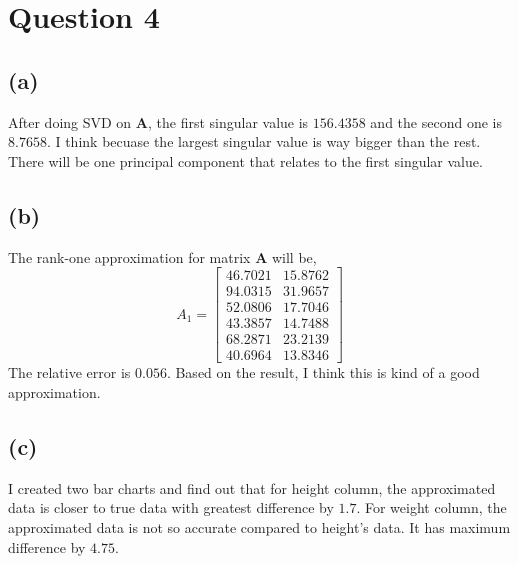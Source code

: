 \documentclass{article}
\newcommand{\bmat}[1]{\begin{bmatrix} #1 \end{bmatrix}}
\newcommand{\mat}[1]{\mathbf{#1}}
\begin{document}
\section*{Question 4}
\subsection*{(a)}
After doing SVD on $\mat{A}$, the first singular value is $156.4358$ and the second one is $8.7658$. I think 
becuase the largest singular value is way bigger than the rest. There will be
one principal component that relates to the first singular value.
\subsection*{(b)}

The rank-one approximation for matrix $\mat{A}$ will be, 
$$A_1 = \bmat{ 46.7021 &  15.8762\\
94.0315 &  31.9657 \\
52.0806  & 17.7046\\
43.3857  & 14.7488\\
68.2871  & 23.2139\\
40.6964  & 13.8346}$$
The relative error is $0.056$. Based on the result, I think this is kind of a good
approximation.

\subsection*{(c)}
I created two bar charts and find out that for height column, the approximated 
data is closer to true data with greatest difference by $1.7$. For weight column,
the approximated data is not so accurate compared to height's data. It has maximum difference 
by $4.75$.
\end{document}
